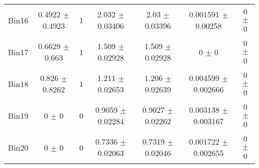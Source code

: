 \begin{tabular}{@{\extracolsep{4pt}}lcccccc@{}}
     Bin16 & 0.4922 $\pm$ 0.4923 & 1 & 2.032 $\pm$ 0.03406 & 2.03 $\pm$ 0.03396 & 0.001591 $\pm$ 0.00258 & 0 $\pm$ 0 \\ 
     Bin17 & 0.6629 $\pm$ 0.663 & 1 & 1.509 $\pm$ 0.02928 & 1.509 $\pm$ 0.02928 & 0 $\pm$ 0 & 0 $\pm$ 0 \\ 
     Bin18 & 0.826 $\pm$ 0.8262 & 1 & 1.211 $\pm$ 0.02653 & 1.206 $\pm$ 0.02639 & 0.004599 $\pm$ 0.002666 & 0 $\pm$ 0 \\ 
     Bin19 & 0 $\pm$ 0 & 0 & 0.9059 $\pm$ 0.02284 & 0.9027 $\pm$ 0.02262 & 0.003138 $\pm$ 0.003167 & 0 $\pm$ 0 \\ 
     Bin20 & 0 $\pm$ 0 & 0 & 0.7336 $\pm$ 0.02063 & 0.7319 $\pm$ 0.02046 & 0.001722 $\pm$ 0.002655 & 0 $\pm$ 0 \\ 
\hline\hline
  \end{tabular}
